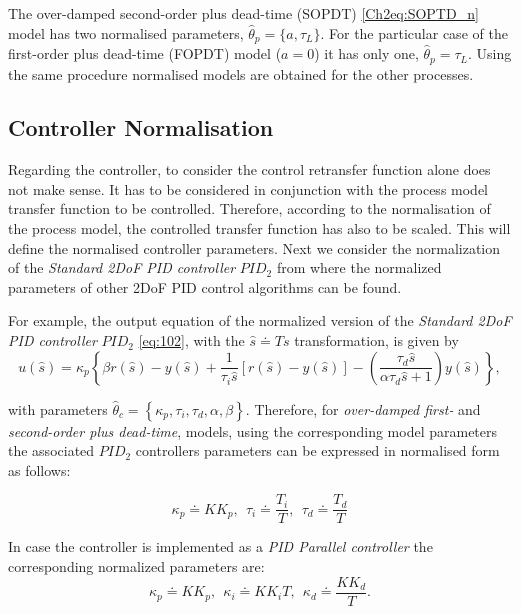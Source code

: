 The over-damped second-order plus dead-time (SOPDT) \eqref{Ch2eq:SOPTD_n} model has two normalised parameters, $\hat{\theta}_p = \{a, \tau_L\}$.  For the particular case of the first-order plus dead-time (FOPDT) model ($a=0$) it has only one, $\hat{\theta}_p = \tau_L$. Using the same procedure normalised models are obtained for the other processes.\\


\subsection{Controller Normalisation}
\label{sec:3.3}

Regarding the controller, to consider the control retransfer function alone does not make sense. It has to be considered in conjunction with the process model transfer function to be controlled. Therefore, according to the normalisation of the process model, the controlled transfer function has also to be scaled. This will define the normalised controller parameters. Next we consider the normalization of the \emph{Standard 2DoF PID controller} $PID_2$ from where the normalized parameters of other 2DoF PID control algorithms can be found.

For example, the output equation of the normalized version of the \emph{Standard 2DoF PID controller} $PID_2$ \eqref{eq:102}, with the $\hat s \doteq T s$ transformation, is given by
\begin{equation}
	u(\hat s) = \kappa_p \left\{\beta r(\hat s)-y(\hat s) + \frac{1}{\tau_i \hat s} \left[r(\hat s)-y(\hat s)\right] - \left(\frac{\tau_d \hat s}{\alpha \tau_d \hat s+1}\right) y(\hat s)\right\},
\end{equation}

\noindent with parameters $\hat{\theta}_c = \left\{\kappa_p, \tau_i, \tau_d, \alpha, \beta \right\}$. Therefore,  for \emph{over-damped first-} and \emph{second-order plus dead-time},  models, using the corresponding model parameters the associated $PID_2$ controllers parameters can be expressed in normalised form as follows:

\begin{equation}
	\kappa_p \doteq K K_p, \ \ \tau_i \doteq \frac{T_i}{T}, \ \ \tau_d \doteq \frac{T_d}{T} 
	\label{Ch2eq:PIDNormalized}
\end{equation}

In case the controller is implemented as a \emph{PID Parallel controller} the corresponding normalized parameters are:
\begin{equation}
	\kappa_p \doteq K K_p, \ \ \kappa_i \doteq K K_i T, \ \ \kappa_d \doteq \frac{K K_d}{T}.	
\end{equation}


